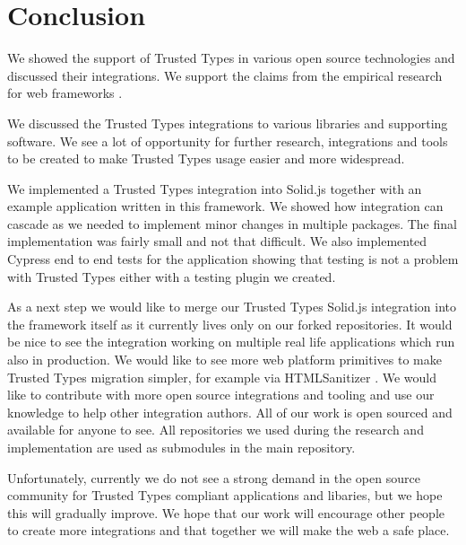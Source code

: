 \chapter{Conclusion}


We showed the support of Trusted Types in various open source technologies and discussed their
integrations. We support the claims from the empirical research for web frameworks
\cite{tt_web_framework_paper}.

We discussed the Trusted Types integrations to various libraries and supporting software. We see a
lot of opportunity for further research, integrations and tools to be created to make Trusted Types
usage easier and more widespread.

We implemented a Trusted Types integration into Solid.js together with an example application
written in this framework. We showed how integration can cascade as we needed to implement minor
changes in multiple packages. The final implementation was fairly small and not that difficult. We
also implemented Cypress end to end tests for the application showing that testing is not a problem
with Trusted Types either with a testing plugin we created.

As a next step we would like to merge our Trusted Types Solid.js integration into the framework
itself as it currently lives only on our forked repositories. It would be nice to see the
integration working on multiple real life applications which run also in production. We would like
to see more web platform primitives to make Trusted Types migration simpler, for example via
HTMLSanitizer \cite{tt_report_mid2021}. We would like to contribute with more open source
integrations and tooling and use our knowledge to help other integration authors. All of our work is
open sourced and available for anyone to see. All repositories we used during the research and
implementation are used as submodules in the main repository.

Unfortunately, currently we do not see a strong demand in the open source community for Trusted
Types compliant applications and libaries, but we hope this will gradually improve. We hope that our
work will encourage other people to create more integrations and that together we will make the web
a safe place.
